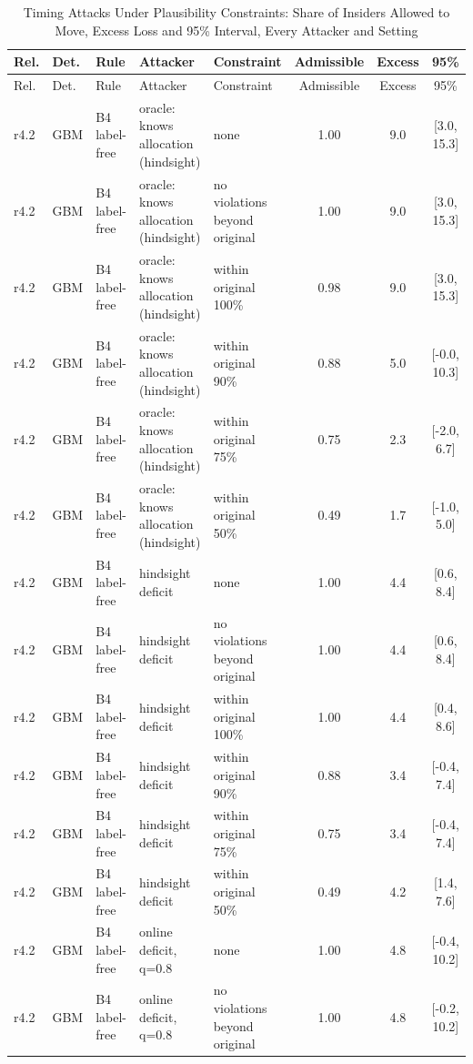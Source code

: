 \documentclass[10pt,onecolumn,letterpaper]{article}
\begin{document}
\begin{longtable}{lllp{4.2cm}p{3.4cm}ccc}
\caption{Timing Attacks Under Plausibility Constraints: Share of Insiders Allowed to Move, Excess Loss and 95\% Interval, Every Attacker and Setting\label{tab:e-m1-constrained}}\\
\toprule
Rel. & Det. & Rule & Attacker & Constraint & Admissible & Excess & 95\% \\
\midrule
\endfirsthead
\toprule
Rel. & Det. & Rule & Attacker & Constraint & Admissible & Excess & 95\% \\
\midrule
\endhead
r4.2 & GBM & B4 label-free & oracle: knows allocation (hindsight) & none & 1.00 & 9.0 & [3.0, 15.3] \\
r4.2 & GBM & B4 label-free & oracle: knows allocation (hindsight) & no violations beyond original & 1.00 & 9.0 & [3.0, 15.3] \\
r4.2 & GBM & B4 label-free & oracle: knows allocation (hindsight) & within original 100\% & 0.98 & 9.0 & [3.0, 15.3] \\
r4.2 & GBM & B4 label-free & oracle: knows allocation (hindsight) & within original 90\% & 0.88 & 5.0 & [-0.0, 10.3] \\
r4.2 & GBM & B4 label-free & oracle: knows allocation (hindsight) & within original 75\% & 0.75 & 2.3 & [-2.0, 6.7] \\
r4.2 & GBM & B4 label-free & oracle: knows allocation (hindsight) & within original 50\% & 0.49 & 1.7 & [-1.0, 5.0] \\
r4.2 & GBM & B4 label-free & hindsight deficit & none & 1.00 & 4.4 & [0.6, 8.4] \\
r4.2 & GBM & B4 label-free & hindsight deficit & no violations beyond original & 1.00 & 4.4 & [0.6, 8.4] \\
r4.2 & GBM & B4 label-free & hindsight deficit & within original 100\% & 1.00 & 4.4 & [0.4, 8.6] \\
r4.2 & GBM & B4 label-free & hindsight deficit & within original 90\% & 0.88 & 3.4 & [-0.4, 7.4] \\
r4.2 & GBM & B4 label-free & hindsight deficit & within original 75\% & 0.75 & 3.4 & [-0.4, 7.4] \\
r4.2 & GBM & B4 label-free & hindsight deficit & within original 50\% & 0.49 & 4.2 & [1.4, 7.6] \\
r4.2 & GBM & B4 label-free & online deficit, q=0.8 & none & 1.00 & 4.8 & [-0.4, 10.2] \\
r4.2 & GBM & B4 label-free & online deficit, q=0.8 & no violations beyond original & 1.00 & 4.8 & [-0.2, 10.2] \\

\end{longtable}
\end{document}
